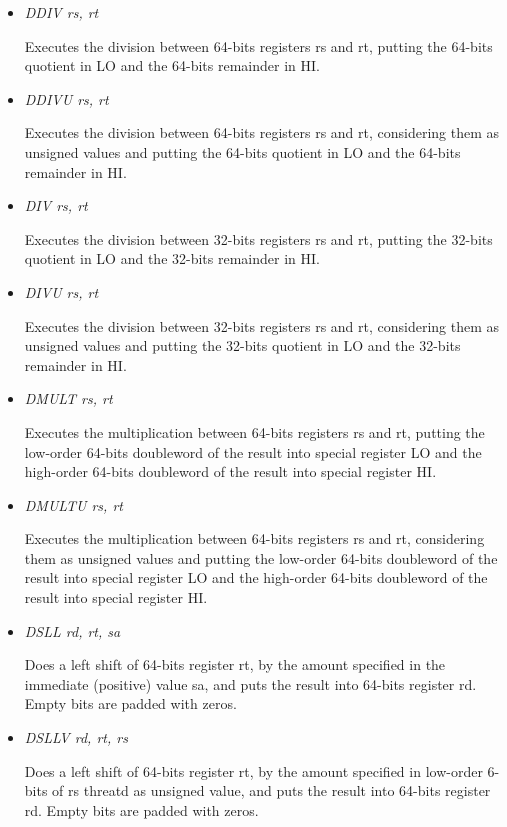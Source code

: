 \documentclass[letterpaper,10pt,english]{sphinxmanual}
\begin{document}
\begin{itemize}
\item {} 
\emph{DDIV rs, rt}

Executes the division between 64-bits registers rs and rt, putting the 64-bits quotient in LO and the
64-bits remainder in HI.

\item {} 
\emph{DDIVU rs, rt}

Executes the division between 64-bits registers rs and rt, considering them as unsigned values
and putting the 64-bits quotient in LO and the 64-bits remainder in HI.

\item {} 
\emph{DIV rs, rt}

Executes the division between 32-bits registers rs and rt, putting the 32-bits quotient in LO and the
32-bits remainder in HI.

\item {} 
\emph{DIVU rs, rt}

Executes the division between 32-bits registers rs and rt, considering them as unsigned values and putting the 32-bits quotient in LO and the 32-bits remainder in HI.

\item {} 
\emph{DMULT rs, rt}

Executes the multiplication between 64-bits registers rs and rt, putting the low-order 64-bits doubleword of the result into special register LO and the high-order 64-bits doubleword of the result into special register HI.

\item {} 
\emph{DMULTU rs, rt}

Executes the multiplication between 64-bits registers rs and rt, considering them as unsigned values and putting the low-order 64-bits doubleword of the result into special register LO and the high-order 64-bits doubleword of the result into special register HI.

\item {} 
\emph{DSLL rd, rt, sa}

Does a left shift of 64-bits register rt, by the amount specified in the immediate (positive) value sa, and puts the result into 64-bits register rd. Empty bits are padded with zeros.

\item {} 
\emph{DSLLV rd, rt, rs}

Does a left shift of 64-bits register rt, by the amount specified in low-order 6-bits of rs threatd as unsigned value, and puts the result into 64-bits register rd. Empty bits are padded with zeros.


\end{itemize}
\end{document}
